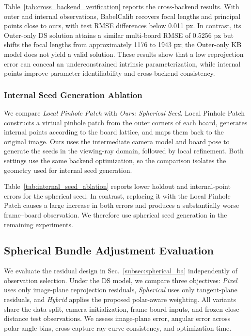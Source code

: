 \documentclass[letterpaper, 10 pt, conference]{ieeeconf}  %
\begin{document}
Table~\ref{tab:cross_backend_verification} reports the cross-backend results.
With outer and internal observations, BabelCalib recovers focal lengths and
principal points close to ours, with test RMSE differences below 0.011 px. In
contrast, its Outer-only DS solution attains a similar multi-board RMSE of
0.5256 px but shifts the focal lengths from approximately 1176 to 1943 px; the
Outer-only KB model does not yield a valid solution. These results show that a
low reprojection error can conceal an underconstrained intrinsic
parameterization, while internal points improve parameter identifiability and
cross-backend consistency.



\subsubsection{Internal Seed Generation Ablation}

We compare \emph{Local Pinhole Patch} with \emph{Ours: Spherical Seed}. Local
Pinhole Patch constructs a virtual pinhole patch from the outer corners of each
board, generates internal points according to the board lattice, and maps them
back to the original image. Ours uses the intermediate camera model and board
pose to generate the seeds in the viewing-ray domain, followed by local
refinement. Both settings use the same backend optimization, so the comparison
isolates the geometry used for internal seed generation.

Table~\ref{tab:internal_seed_ablation} reports lower holdout and internal-point
errors for the spherical seed. In contrast, replacing it with the Local Pinhole
Patch causes a large increase in both errors and produces a substantially worse
frame--board observation. We therefore use spherical seed generation in the
remaining experiments.



\subsection{Spherical Bundle Adjustment Evaluation}

We evaluate the residual design in Sec.~\ref{subsec:spherical_ba} independently
of observation selection. Under the DS model, we compare three objectives:
\emph{Pixel} uses only image-plane reprojection residuals, \emph{Spherical}
uses only tangent-plane residuals, and \emph{Hybrid} applies the proposed
polar-aware weighting. All variants share the data split, camera
initialization, frame-board inputs, and frozen close-distance test
observations. We assess image-plane error, angular error across polar-angle
bins, cross-capture ray-curve consistency, and optimization time.
\end{document}
